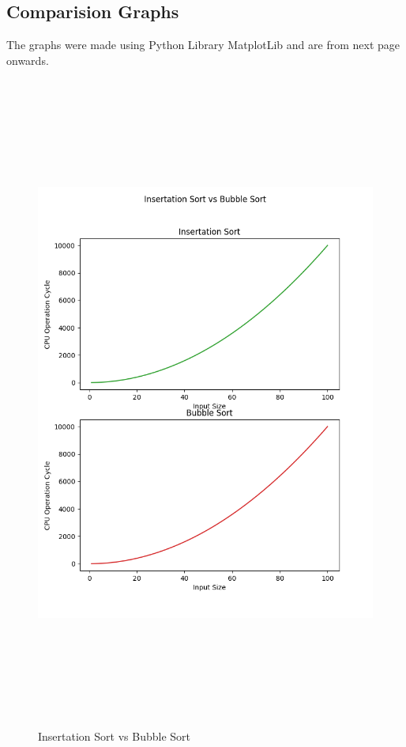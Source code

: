 \documentclass{article}
\begin{document}
\subsection{Comparision Graphs}
The graphs were made using Python Library MatplotLib and are from next page onwards.
\clearpage
\begin{figure}[h]
    \centerline{\includegraphics[width=7in,height=8.5in]{Insertation Sort_Bubble Sort.png}}
    \caption{Insertation Sort vs Bubble Sort}
\end{figure}
\end{document}

